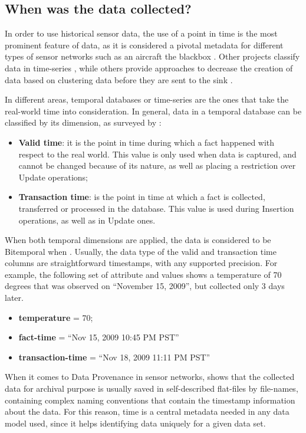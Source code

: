 \subsection{When was the data collected?}

In order to use historical sensor data, the use of a point in time is the most
prominent feature of data, as it is considered a pivotal metadata for different
types of sensor networks such as an aircraft the blackbox
\cite{sn-exemple-blackbox}. Other projects classify data in time-series
\cite{sn-time-series-example}, while others provide approaches to decrease
the creation of data based on clustering data before they are sent to the sink
\cite{sn-time-series}.

In different areas, temporal databases or time-series are the ones that take
the real-world time into consideration. In general, data in a temporal database
can be classified by its dimension, as surveyed by \cite{db-temporal}:

\begin{itemize}
  \item \textbf{Valid time}: it is the point in time during which a fact
  happened with respect to the real world. This value is only used when data is
  captured, and cannot be changed because of its nature, as well as placing a
  restriction over Update operations;
  \item \textbf{Transaction time}: is the point in time at which a fact is
  collected, transferred or processed in the database. This value is used
  during Insertion operations, as well as in Update ones.
\end{itemize}

When both temporal dimensions are applied, the data is considered to be
Bitemporal when \cite{db-temporal}. Usually, the data type of the valid and
transaction time columns are straightforward timestamps, with any supported
precision. For example, the following set of attribute and values shows a
temperature of 70 degrees that was observed on ``November 15, 2009'', but
collected only 3 days later.

\begin{itemize}
  \item \textbf{temperature} = 70;
  \item \textbf{fact-time} = ``Nov 15, 2009 10:45 PM PST''
  \item \textbf{transaction-time} = ``Nov 18, 2009 11:11 PM PST''
\end{itemize}

When it comes to Data Provenance in sensor networks, \cite{sn-provenance}
shows that the collected data for archival purpose is usually saved in 
self-described flat-files by file-names, containing complex naming conventions
that contain the timestamp information about the data. For this reason, time
is a central metadata needed in any data model used, since it helps
identifying data uniquely for a given data set.


